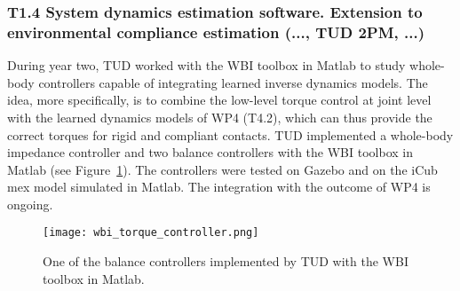 \subsubsection*{T1.4 System dynamics estimation software. Extension to
environmental compliance estimation (..., TUD 2PM, ...)}

During year two, TUD worked with the WBI toolbox in Matlab to study whole-body controllers capable of integrating learned inverse dynamics models. The idea, more specifically, is to combine the low-level torque control at joint level with the learned dynamics models of WP4 (T4.2), which can thus provide the correct torques for rigid and compliant contacts. TUD implemented a whole-body impedance controller and two balance controllers with the WBI toolbox in Matlab (see Figure~\ref{fig:wbitud}). The controllers were tested on Gazebo and on the iCub mex model simulated in Matlab. The integration with the outcome of WP4 is ongoing.

 \begin{figure}
 \centering
 \texttt{[image: wbi\_torque\_controller.png]}
  \caption{One of the balance controllers implemented by TUD with the WBI toolbox in Matlab. 
 }
 \label{fig:wbitud}
 \end{figure}



% 
